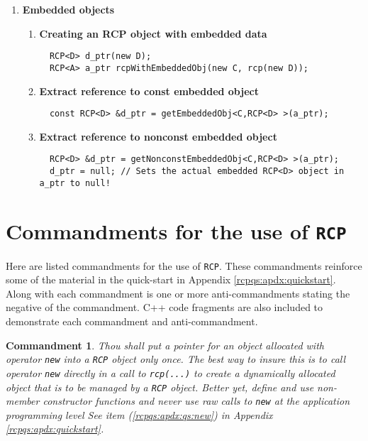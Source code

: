 \documentclass[pdf,ps2pdf,11pt]{SANDreport}
\newtheorem{commandment}{Commandment}
\begin{document}
\begin{enumerate}
\item {\bf Embedded objects}
\label{rcpqs:apdx:qs:embedded-objects}

%
\begin{enumerate}
%
\item {\bf Creating an RCP object with embedded data}
%
{\small\begin{verbatim}
  RCP<D> d_ptr(new D);
  RCP<A> a_ptr rcpWithEmbeddedObj(new C, rcp(new D));
\end{verbatim}}
%
\item {\bf Extract reference to const embedded object}
%
{\small\begin{verbatim}
  const RCP<D> &d_ptr = getEmbeddedObj<C,RCP<D> >(a_ptr);
\end{verbatim}}
%
\item {\bf Extract reference to nonconst embedded object}
%
{\small\begin{verbatim}
  RCP<D> &d_ptr = getNonconstEmbeddedObj<C,RCP<D> >(a_ptr);
  d_ptr = null; // Sets the actual embedded RCP<D> object in a_ptr to null!
\end{verbatim}}
%
\end{enumerate}


\end{enumerate}

%
\section{Commandments for the use of {}\texttt{RCP}}
\label{rcpqs:apdx:commandments}
%

Here are listed commandments for the use of {}\texttt{RCP}.  These
commandments reinforce some of the material in the quick-start in Appendix
{}\ref{rcpqs:apdx:quickstart}.  Along with each commandment is one or more
anti-commandments stating the negative of the commandment.  C++ code fragments
are also included to demonstrate each commandment and anti-commandment.

\begin{commandment}\label{rcp:cmd:rcp-new}
Thou shall put a pointer for an object allocated with operator
{}\texttt{new} into a {}\texttt{RCP} object only once.  The best way
to insure this is to call operator {}\texttt{new} directly in a call
to {}\texttt{rcp(...)} to create a dynamically allocated object that
is to be managed by a {}\texttt{RCP} object.  Better yet, define and
use non-member constructor functions and never use raw calls to
{}\texttt{new} at the application programming level See item
({}\ref{rcpqs:apdx:qs:new}) in Appendix {}\ref{rcpqs:apdx:quickstart}.
\end{commandment}
\end{document}
